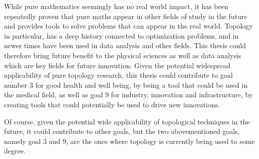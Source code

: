 While pure mathematics seemingly has no real world impact, it has been repeatedly proven that pure maths appear in other fields of study in the future and provides tools to solve problems that can appear in the real world. Topology in particular, has a deep history connected to optimization problems, and in newer times have been used in data analysis and other fields. This thesis could therefore bring future benefit to the physical sciences as well as data analysis which are key fields for future innovation. Given the potential widespread applicability of pure topology research, this thesis could contribute to goal number 3 for good health and well being, by being a tool that could be used in the medical field, as well as goal 9 for industry, innovation and infrastructure, by creating tools that could potentially be used to drive new innovations.

Of course, given the potential wide applicability of topological techniques in the future, it could contribute to other goals, but the two abovementioned goals, namely goal 3 and 9, are the ones where topology is currently being used to some degree.
